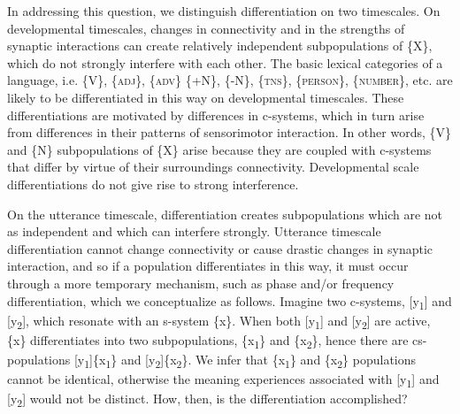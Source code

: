   In addressing this question, we distinguish differentiation on two timescales. On developmental timescales, changes in connectivity and in the strengths of synaptic interactions can create relatively independent subpopulations of \{X\}, which do not strongly interfere with each other. The basic lexical categories of a language, i.e. \{V\}, \{\textsc{adj}\}, \{\textsc{adv}\} \{+N\}, \{-N\}, \{\textsc{tns}\}, \{\textsc{person}\}, \{\textsc{number}\}, etc. are likely to be differentiated in this way on developmental timescales. These differentiations are motivated by differences in c-systems, which in turn arise from differences in their patterns of sensorimotor interaction. In other words, \{V\} and \{N\} subpopulations of \{X\} arise because they are coupled with c-systems that differ by virtue of their surroundings connectivity. Developmental scale differentiations do not give rise to strong interference.

  On the utterance timescale, differentiation creates subpopulations which are not as independent and which can interfere strongly. Utterance timescale differentiation cannot change connectivity or cause drastic changes in synaptic interaction, and so if a population differentiates in this way, it must occur through a more temporary mechanism, such as phase and/or frequency differentiation, which we conceptualize as follows. Imagine two c-systems, [y\textsubscript{1}] and [y\textsubscript{2}], which resonate with an s-system \{x\}. When both [y\textsubscript{1}] and [y\textsubscript{2}] are active, \{x\} differentiates into two subpopulations, \{x\textsubscript{1}\} and \{x\textsubscript{2}\}, hence there are cs-populations [y\textsubscript{1}]\{x\textsubscript{1}\} and [y\textsubscript{2}]\{x\textsubscript{2}\}. We infer that \{x\textsubscript{1}\} and \{x\textsubscript{2}\} populations cannot be identical, otherwise the meaning experiences associated with [y\textsubscript{1}] and [y\textsubscript{2}] would not be distinct. How, then, is the differentiation accomplished? 

